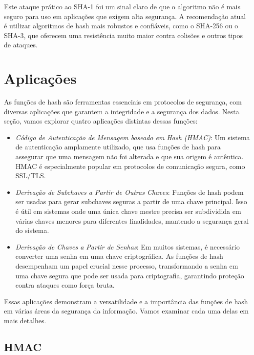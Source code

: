 Este ataque prático ao SHA-1 foi um sinal claro de que o algoritmo não é mais seguro para uso em aplicações que exigem alta segurança.
A recomendação atual é utilizar algoritmos de hash mais robustos e confiáveis, como o SHA-256 ou o SHA-3, que oferecem uma resistência muito maior contra colisões e outros tipos de ataques.

\section{Aplicações}
\label{sec:aplicacoes}

As funções de hash são ferramentas essenciais em protocolos de segurança, com diversas aplicações que garantem a integridade e a segurança dos dados.
Nesta seção, vamos explorar quatro aplicações distintas dessas funções:

\begin{itemize}
\item[] {\em Código de Autenticação de Mensagem baseado em Hash (HMAC)}:
  Um sistema de autenticação amplamente utilizado, que usa funções de hash para assegurar que uma mensagem não foi alterada e que sua origem é autêntica.
  HMAC é especialmente popular em protocolos de comunicação segura, como SSL/TLS.

\item[] {\em Derivação de Subchaves a Partir de Outras Chaves}:
  Funções de hash podem ser usadas para gerar subchaves seguras a partir de uma chave principal.
  Isso é útil em sistemas onde uma única chave mestre precisa ser subdividida em várias chaves menores para diferentes finalidades, mantendo a segurança geral do sistema.

\item[] {\em Derivação de Chaves a Partir de Senhas}:
  Em muitos sistemas, é necessário converter uma senha em uma chave criptográfica.
  As funções de hash desempenham um papel crucial nesse processo, transformando a senha em uma chave segura que pode ser usada para criptografia, garantindo proteção contra ataques como força bruta.
\end{itemize}
  
Essas aplicações demonstram a versatilidade e a importância das funções de hash em várias áreas da segurança da informação.
Vamos examinar cada uma delas em mais detalhes.

\subsection{HMAC}
\label{sec:hmac}

